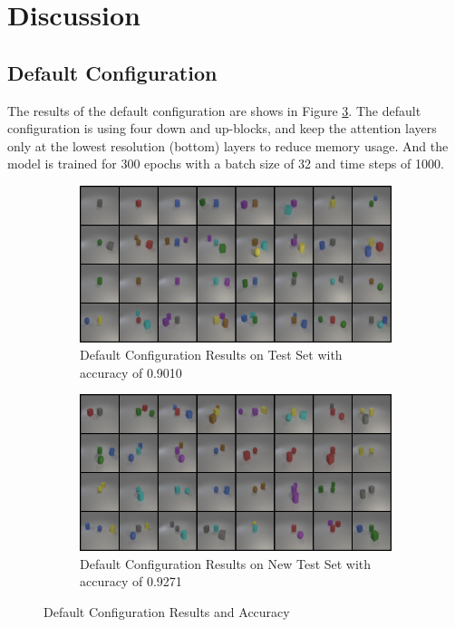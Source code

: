 \section{Discussion}

\subsection{Default Configuration}

The results of the default configuration are shows in Figure \ref{fig:default}.
The default configuration is using four down and up-blocks, and keep the attention layers only at the lowest resolution (bottom) layers to reduce memory usage.
And the model is trained for 300 epochs with a batch size of 32 and time steps of 1000.

\begin{figure}[h]
    \centering
    \begin{subfigure}{0.48\textwidth}
        \centering
        \includegraphics[width=\textwidth]{figures/default_test.png}
        \caption{Default Configuration Results on Test Set with accuracy of 0.9010}
        \label{fig:default_test}
    \end{subfigure}
    \hfill
    \begin{subfigure}{0.48\textwidth}
        \centering
        \includegraphics[width=\textwidth]{figures/default_new_test.png}
        \caption{Default Configuration Results on New Test Set with accuracy of 0.9271}
        \label{fig:default_new_test}
    \end{subfigure}
    \caption{Default Configuration Results and Accuracy}
    \label{fig:default}
\end{figure}

